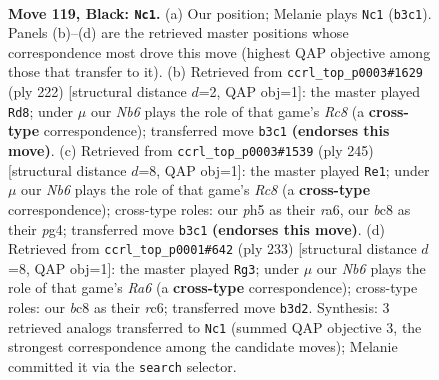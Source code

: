 \documentclass[11pt]{article}
\begin{document}
\clearpage

\begin{figure}[p]\centering
\begin{subfigure}{0.46\textwidth}\centering
\resizebox{\linewidth}{!}{%
\newchessgame
\chessboard[
  setfen={2B5/6k1/8/6PP/8/1n4K1/8/8 b - - 8 119},
  showmover=false,
  pgfstyle=straightmove, color=movearrow, markmove={b3-c1}
]}
\caption{}
\end{subfigure}\hfill
\begin{subfigure}{0.46\textwidth}\centering
\resizebox{\linewidth}{!}{%
\newchessgame
\chessboard[
  setfen={2R5/8/6b1/4k3/8/5pp1/8/5K2 w - - 74 112},
  showmover=false,
  pgfstyle=straightmove, color=movearrow, markmove={c8-d8}
]}
\caption{}
\end{subfigure}
\\[4pt]
\begin{subfigure}{0.46\textwidth}\centering
\resizebox{\linewidth}{!}{%
\newchessgame
\chessboard[
  setfen={8/6k1/R7/6P1/6P1/8/6K1/2r5 b - - 20 123},
  showmover=false,
  pgfstyle=straightmove, color=movearrow, markmove={c1-e1}
]}
\caption{}
\end{subfigure}\hfill
\begin{subfigure}{0.46\textwidth}\centering
\resizebox{\linewidth}{!}{%
\newchessgame
\chessboard[
  setfen={8/6k1/2R5/5PP1/7p/r7/5K2/8 b - - 0 117},
  showmover=false,
  pgfstyle=straightmove, color=movearrow, markmove={a3-g3}
]}
\caption{}
\end{subfigure}
\caption{\textbf{Move 119, Black: \texttt{Nc1}.} (a) Our position; Melanie plays \texttt{Nc1} (\texttt{b3c1}). Panels (b)--(d) are the retrieved master positions whose correspondence most drove this move (highest QAP objective among those that transfer to it). (b) Retrieved from \texttt{ccrl\_top\_p0003\#1629} (ply 222) [structural distance $d$=2, QAP obj=1]: the master played \texttt{Rd8}; under $\mu$ our \emph{Nb6} plays the role of that game's \emph{Rc8} (a \textbf{cross-type} correspondence); transferred move \texttt{b3c1} \textbf{(endorses this move)}. (c) Retrieved from \texttt{ccrl\_top\_p0003\#1539} (ply 245) [structural distance $d$=8, QAP obj=1]: the master played \texttt{Re1}; under $\mu$ our \emph{Nb6} plays the role of that game's \emph{Rc8} (a \textbf{cross-type} correspondence); cross-type roles: our \emph{p}h5 as their \emph{r}a6, our \emph{b}c8 as their \emph{p}g4; transferred move \texttt{b3c1} \textbf{(endorses this move)}. (d) Retrieved from \texttt{ccrl\_top\_p0001\#642} (ply 233) [structural distance $d$=8, QAP obj=1]: the master played \texttt{Rg3}; under $\mu$ our \emph{Nb6} plays the role of that game's \emph{Ra6} (a \textbf{cross-type} correspondence); cross-type roles: our \emph{b}c8 as their \emph{r}c6; transferred move \texttt{b3d2}. Synthesis: 3 retrieved analogs transferred to \texttt{Nc1} (summed QAP objective 3, the strongest correspondence among the candidate moves); Melanie committed it via the \texttt{search} selector.}
\label{fig:thought-m237}
\end{figure}
\end{document}
